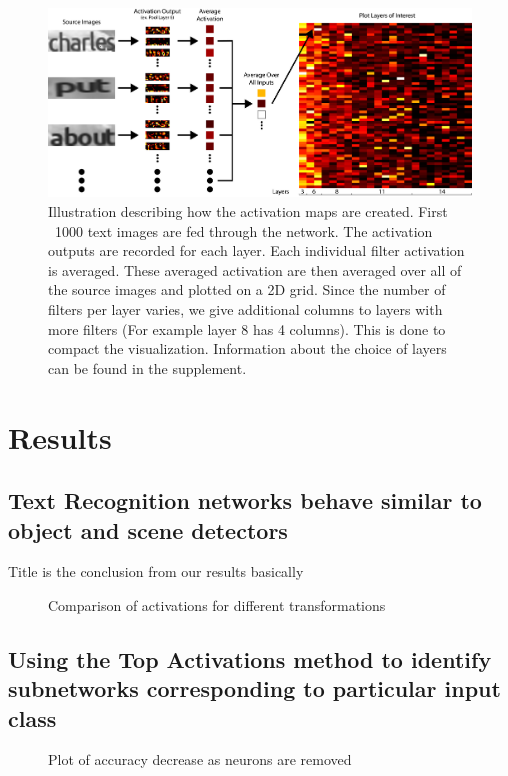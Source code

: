 \documentclass[10pt,twocolumn,letterpaper]{article}
\begin{document}
\begin{figure}
\includegraphics[width=1\textwidth]{Figures/activations_map_overview/act_map_overview-01.png}
\caption{Illustration describing how the activation maps are created. First ~1000 text images are fed through the network. The activation outputs are recorded for each layer. Each individual filter activation is averaged. These averaged activation are then averaged over all of the source images and plotted on a 2D grid. Since the number of filters per layer varies, we give additional columns to layers with more filters (For example layer 8 has 4 columns). This is done to compact the visualization. Information about the choice of layers can be found in the supplement.}
\label{fig:subvis}
\end{figure}

\section{Results}

\subsection{Text Recognition networks behave similar to object and scene detectors}
Title is the conclusion from our results basically 

\begin{figure}
\caption{Comparison of activations for different transformations}
\label{fig:comp}
\end{figure}

\subsection{Using the Top Activations method to identify subnetworks corresponding to particular input class}

\begin{figure}
\caption{Plot of accuracy decrease as neurons are removed}
\label{fig:comp}
\end{figure}
\end{document}
